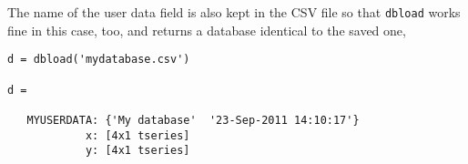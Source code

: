 The name of the user data field is also kept in the CSV file so that
\texttt{dbload} works fine in this case, too, and returns a database
identical to the saved one,

\begin{verbatim}
d = dbload('mydatabase.csv')

d = 

   MYUSERDATA: {'My database'  '23-Sep-2011 14:10:17'}
            x: [4x1 tseries]
            y: [4x1 tseries]
\end{verbatim}


